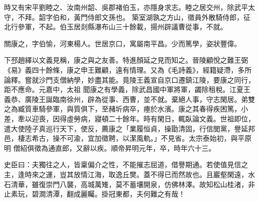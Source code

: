 \begin{pinyinscope}
 時又有宋平劉睦之、汝南州韶、吳郡褚伯玉，亦隱身求志。睦之居交州，除武平太守，不拜。韶字伯和，黃門侍郎文孫也。
 築室湖孰之方山，徵員外散騎侍郎，征北行參軍，不起。伯玉居剡縣瀑布山三十餘載，揚州辟議曹從事，不就。



 關康之，字伯愉，河東楊人。世居京口，寓屬南平昌。少而篤學，姿狀豐偉。



 下邳趙繹以文義見稱，康之與之友善。特進顏延之見而知之。晉陵顧悅之難王弼《易》義四十餘條，康之申王難顧，遠有情理。又為《毛詩義》，經籍疑滯，多所論釋。嘗就沙門支僧納學，妙盡其能。竟陵王義宣自京口遷鎮江陵，要康之同行，距不應命。元嘉中，太祖
 聞康之有學義，除武昌國中軍將軍，蠲除租稅。江夏王義恭、廣陵王誕臨南徐州，辟為從事、西曹，並不就。棄絕人事，守志閑居。弟雙之為臧質車騎參軍，與質俱下，至赭圻病卒，瘞於水濱。康之其春得疾困篤，小差，牽以迎喪，因得虛勞病，寢頓二十餘年。時有閑日，輒臥論文義。世祖即位，遣大使陸子真巡行天下，使反，薦康之「業履恒貞，操勖清固，行信閭黨，譽延邦邑，棲志希古，操不可渝，宜加徵聘，以潔風軌。」不見省。太宗泰始初，與平原明
 僧紹俱徵為通直郎，又辭以疾。順帝昇明元年，卒，時年六十三。



 史臣曰：夫獨往之人，皆稟偏介之性，不能摧志屈道，借譽期通。若使值見信之主，逢時來之運，豈其放情江海，取逸丘樊。蓋不得已而然故也。且巖壑閑遠，水石清華，雖復崇門八襲，高城萬雉，莫不蓄壤開泉，仿佛林澤。故知松山桂渚，非止素玩，碧澗清潭，翻成麗矚。掛冠東都，夫何難之有哉！



\end{pinyinscope}